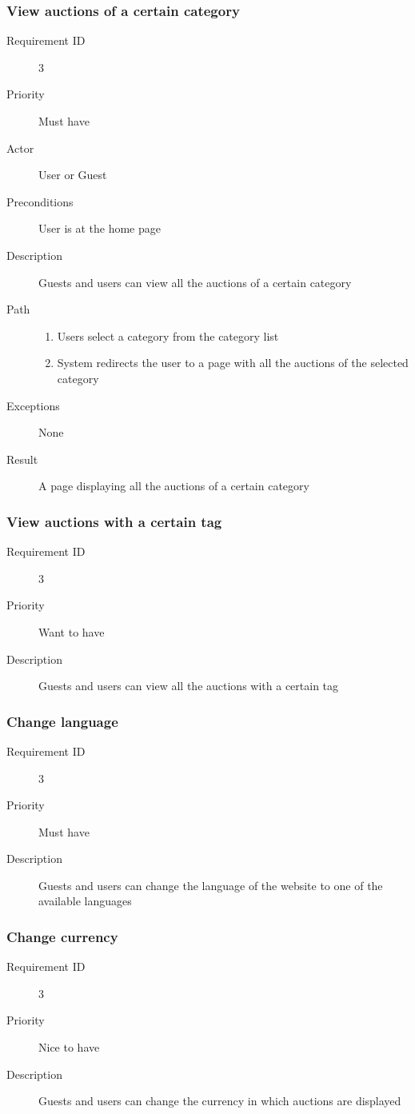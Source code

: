		\subsubsection{View auctions of a certain category}
			\begin{description}
				\item[Requirement ID] 3
				\item[Priority] Must have
				\item[Actor] User or Guest
				\item[Preconditions] User is at the home page
				\item[Description] Guests and users can view all the auctions of a certain category
				\item[Path]
 					\begin{enumerate}
						\item Users select a category from the category list
						\item System redirects the user to a page with all the auctions of the
							selected category
					\end{enumerate}
				\item[Exceptions] None
				\item[Result] A page displaying all the auctions of a certain category
			\end{description}
		\subsubsection{View auctions with a certain tag}
			\begin{description}
				\item[Requirement ID] 3
				\item[Priority] Want to have
				\item[Description] Guests and users can view all the auctions with a certain tag
			\end{description}
		\subsubsection{Change language}
			\begin{description}
				\item[Requirement ID] 3
				\item[Priority] Must have
				\item[Description] Guests and users can change the language of the website to one
					of the available languages
			\end{description}
		\subsubsection{Change currency}
			\begin{description}
				\item[Requirement ID] 3
				\item[Priority] Nice to have
				\item[Description] Guests and users can change the currency in which auctions are
					displayed
			\end{description}
